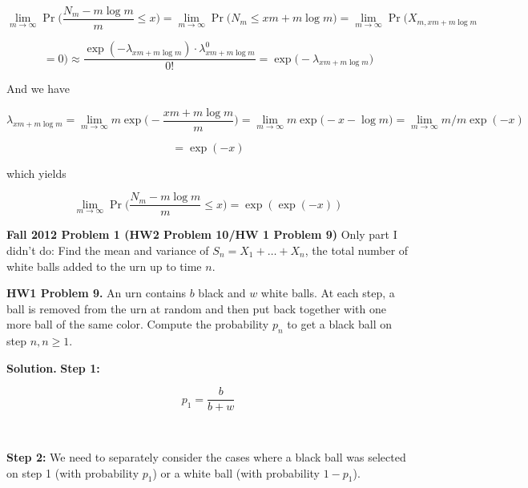 \documentclass{article}
\begin{document}
\begin{enumerate}[(a)]
\[
\lim_{m \to \infty} \Pr \bigg( \frac{N_m - m \log m}{m} \leq x \bigg) = \lim_{m \to \infty} \Pr \big( N_m \leq xm + m \log    m\big) = \lim_{m \to \infty} \Pr \big( X_{m, {xm + m \log    m}} 
\]

\[
= 0) \approx \frac{\exp(-\lambda_ {xm + m \log    m}) \cdot \lambda_ {xm + m \log    m}^0}{0!} = \exp \big(-\lambda_ {xm + m \log    m} \big)
\]



And we have

\[
\lambda_ {xm + m \log    m} = \lim_{m \to \infty} m \exp \bigg(-\frac{xm + m \log    m}{m} \bigg) = \lim_{m \to \infty} m \exp \big(-x -  \log    m\big)   = \lim_{m \to \infty} m/m \exp (-x ) 
\]



\[
 = \exp(-x)
\]

which yields

\[
\boxed{
\lim_{m \to \infty} \Pr \bigg( \frac{N_m - m \log m}{m} \leq x \bigg)  = \exp( \exp(-x))}
\]






\end{enumerate}


\textbf{Fall 2012 Problem 1 (HW2 Problem 10/HW 1 Problem 9)} Only part I didn't do: Find the mean and variance of \(S_n = X_1 + \ldots + X_n\), the total number of white balls added to the urn up to time \(n\).

\textbf{HW1 Problem 9.} An urn contains \(b\) black and \(w\) white balls. At each step, a ball is removed from the urn at random and then put back together with one more ball of the same color. Compute the probability \(p_n\) to get a black ball on step \(n, n \geq 1\).

\textbf{Solution.} \textbf{Step 1:}

\[
p_1 = \frac{b}{b+w}
\]

\

\textbf{Step 2:} We need to separately consider the cases where a black ball was selected on step 1 (with probability \(p_1\)) or a white ball (with probability \(1 - p_1\)).
\end{document}
